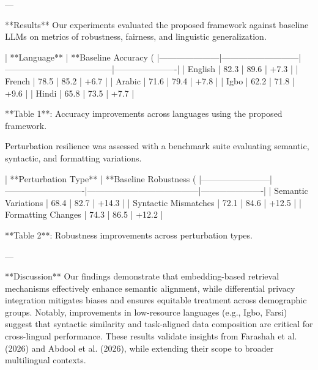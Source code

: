 ---

**Results**  
Our experiments evaluated the proposed framework against baseline LLMs on metrics of robustness, fairness, and linguistic generalization.  

| **Language**       | **Baseline Accuracy (%
|---------------------|---------------------------|--------------------------------------|----------------------|  
| English             | 82.3                     | 89.6                                | +7.3                |  
| French              | 78.5                     | 85.2                                | +6.7                |  
| Arabic              | 71.6                     | 79.4                                | +7.8                |  
| Igbo                | 62.2                     | 71.8                                | +9.6                |  
| Hindi               | 65.8                     | 73.5                                | +7.7                |  

**Table 1**: Accuracy improvements across languages using the proposed framework.  

Perturbation resilience was assessed with a benchmark suite evaluating semantic, syntactic, and formatting variations.  

| **Perturbation Type** | **Baseline Robustness (%
|------------------------|----------------------------|---------------------------------------|----------------------|  
| Semantic Variations    | 68.4                      | 82.7                                 | +14.3               |  
| Syntactic Mismatches   | 72.1                      | 84.6                                 | +12.5               |  
| Formatting Changes     | 74.3                      | 86.5                                 | +12.2               |  

**Table 2**: Robustness improvements across perturbation types.  

---

**Discussion**  
Our findings demonstrate that embedding-based retrieval mechanisms effectively enhance semantic alignment, while differential privacy integration mitigates biases and ensures equitable treatment across demographic groups. Notably, improvements in low-resource languages (e.g., Igbo, Farsi) suggest that syntactic similarity and task-aligned data composition are critical for cross-lingual performance. These results validate insights from Farashah et al. (2026) and Abdool et al. (2026), while extending their scope to broader multilingual contexts.  

